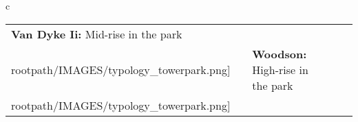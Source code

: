 \begin{table}[H]
        \begin{tabular}{c}
        \begin{tabular}{m{1.25in} m{2in} m{.1in} m{1.25in} m{2in}}
\textbf{Van Dyke Ii:} {Mid-rise in the park} & \texttt{[image: \\rootpath/IMAGES/typology\_towerpark.png]} & & \textbf{Woodson:} {High-rise in the park} & \texttt{[image: \\rootpath/IMAGES/typology\_towerpark.png]}
\end{tabular}\end{tabular}
        \end{table}